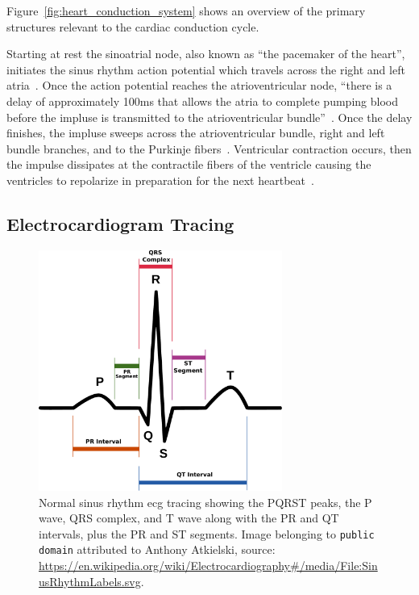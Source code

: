 \documentclass[\main/thesis.tex]{subfiles}
\begin{document}
Figure~\ref{fig:heart_conduction_system} shows an overview of the primary structures relevant to the cardiac conduction cycle.

Starting at rest the sinoatrial node, also known as ``the pacemaker of the heart'', initiates the sinus rhythm action potential which travels across the right and left atria~\cite{betts-anatomy-and-physiology}.
Once the action potential reaches the atrioventricular node, ``there is a delay of approximately 100ms that allows the atria to complete pumping blood before the impluse is transmitted to the atrioventricular bundle''~\cite{betts-anatomy-and-physiology}.
Once the delay finishes, the impluse sweeps across the atrioventricular bundle, right and left bundle branches, and to the Purkinje fibers~\cite{betts-anatomy-and-physiology}.
Ventricular contraction occurs, then the impulse dissipates at the contractile fibers of the ventricle causing the ventricles to repolarize in preparation for the next heartbeat~\cite{betts-anatomy-and-physiology}.

\subsection{Electrocardiogram Tracing}

\begin{figure}[ht]
    \centering
    \includegraphics[width=8cm]{figure/PQRST_NormalSinusRhythm.pdf}
    \caption[Normal sinus rhythm \gls{ecg} tracing with PQRST peaks annotated.]{Normal sinus rhythm \gls{ecg} tracing showing the PQRST peaks, the P wave, QRS complex, and T wave along with the PR and QT intervals, plus the PR and ST segments.
    Image belonging to \texttt{public domain} attributed to Anthony Atkielski, source: \url{https://en.wikipedia.org/wiki/Electrocardiography\#/media/File:SinusRhythmLabels.svg}.
    }
    \label{fig:pqrst_nsr}
\end{figure}
\end{document}
